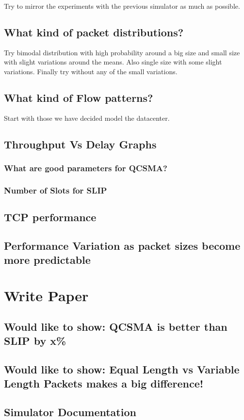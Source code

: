 \documentclass{IEEEtran}%
\begin{document}
Try to mirror the experiments with the previous simulator as much as possible.
\subsection{What kind of packet distributions?}
Try bimodal distribution with high probability around a big size and small size with slight variations around the means.  Also single size with some slight variations.  Finally try without any of the small variations.
\subsection{What kind of Flow patterns?}
Start with those we have decided model the datacenter.
\subsection{Throughput Vs Delay Graphs}
\subsubsection{What are good parameters for QCSMA?}
\subsubsection{Number of Slots for SLIP}
\subsection{TCP performance}
\subsection{Performance Variation as packet sizes become more predictable}

\section{Write Paper}
\subsection{Would like to show: QCSMA is better than SLIP by x\%}
\subsection{Would like to show: Equal Length vs Variable Length Packets makes a big difference!}
\subsection{Simulator Documentation}
\end{document}
